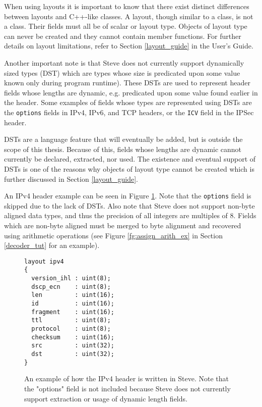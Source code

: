 When using layouts it is important to know that there exist distinct differences between layouts and C++-like classes. A layout, though similar to a class, is not a class. Their fields must all be of scalar or layout type. Objects of layout type can never be created and they cannot contain member functions. For further details on layout limitations, refer to Section \ref{layout_guide} in the User's Guide.

Another important note is that Steve does not currently support dynamically sized types (DST) which are types whose size is predicated upon some value known only during program runtime). These DSTs are used to represent header fields whose lengths are dynamic, e.g. predicated upon some value found earlier in the header. Some examples of fields whose types are represented using DSTs are the \texttt{options} fields in IPv4, IPv6, and TCP headers, or the \texttt{ICV} field in the IPSec header.

DSTs are a language feature that will eventually be added, but is outside the scope of this thesis. Because of this, fields whose lengths are dynamic cannot currently be declared, extracted, nor used. The existence and eventual support of DSTs is one of the reasons why objects of layout type cannot be created which is further discussed in Section \ref{layout_guide}.

An IPv4 header example can be seen in Figure \ref{fg:ipv4_layout_ex}. Note that the \texttt{options} field is skipped due to the lack of DSTs. Also note that Steve does not support non-byte aligned data types, and thus the precision of all integers are multiples of 8. Fields which are non-byte aligned must be merged to byte alignment and recovered using arithmetic operations (see Figure \ref{fg:assign_arith_ex} in Section \ref{decoder_tut} for an example). 

\begin{figure}[ht]
\begin{lstlisting}
layout ipv4
{
  version_ihl : uint(8);
  dscp_ecn    : uint(8);
  len         : uint(16);
  id          : uint(16);
  fragment    : uint(16);
  ttl         : uint(8);
  protocol    : uint(8);
  checksum    : uint(16);
  src         : uint(32);
  dst         : uint(32);
}
\end{lstlisting}
\caption{An example of how the IPv4 header is written in Steve. Note that the "options" field is not included because Steve does not currently support extraction or usage of dynamic length fields.}
\label{fg:ipv4_layout_ex}
\end{figure}

